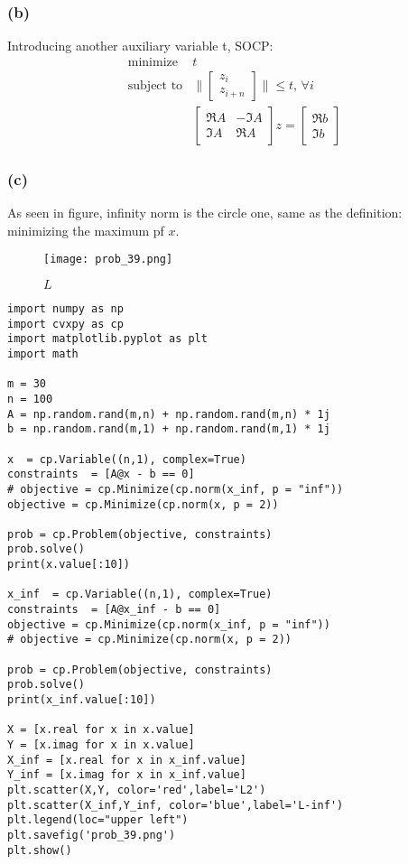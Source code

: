 \documentclass{article}
\begin{document}
  \subsubsection*{(b)}
  Introducing another auxiliary variable t, SOCP:
     \[  \boxed{  \begin{array}{ll}
    \mbox{minimize}   & t  \\
    \mbox{subject to} &  \| \begin{bmatrix}
z_i\\
z_{i+n}
\end{bmatrix} \| \le t, \,\forall i
\\
    & \begin{bmatrix}
\Re A & -\Im A\\
\Im A & \Re A
\end{bmatrix}
z=
\begin{bmatrix}
\Re b\\
\Im b
\end{bmatrix}   
         \end{array} 
         }
  \]    

    \subsubsection*{(c)}
    As seen in figure, infinity norm is the circle one, same as the definition:  minimizing the maximum pf $x$.
    \begin{figure}[h!]
\begin{center}
  \texttt{[image: prob\_39.png]}
\end{center}
\caption{ $L$}
\end{figure}
\begin{verbatim}
import numpy as np
import cvxpy as cp
import matplotlib.pyplot as plt
import math

m = 30
n = 100
A = np.random.rand(m,n) + np.random.rand(m,n) * 1j
b = np.random.rand(m,1) + np.random.rand(m,1) * 1j

x  = cp.Variable((n,1), complex=True)
constraints  = [A@x - b == 0]
# objective = cp.Minimize(cp.norm(x_inf, p = "inf"))
objective = cp.Minimize(cp.norm(x, p = 2))

prob = cp.Problem(objective, constraints)
prob.solve()
print(x.value[:10])

x_inf  = cp.Variable((n,1), complex=True)
constraints  = [A@x_inf - b == 0]
objective = cp.Minimize(cp.norm(x_inf, p = "inf"))
# objective = cp.Minimize(cp.norm(x, p = 2))

prob = cp.Problem(objective, constraints)
prob.solve()
print(x_inf.value[:10])

X = [x.real for x in x.value]
Y = [x.imag for x in x.value]
X_inf = [x.real for x in x_inf.value]
Y_inf = [x.imag for x in x_inf.value]
plt.scatter(X,Y, color='red',label='L2')
plt.scatter(X_inf,Y_inf, color='blue',label='L-inf')
plt.legend(loc="upper left")
plt.savefig('prob_39.png')
plt.show()

\end{verbatim}
\end{document}
